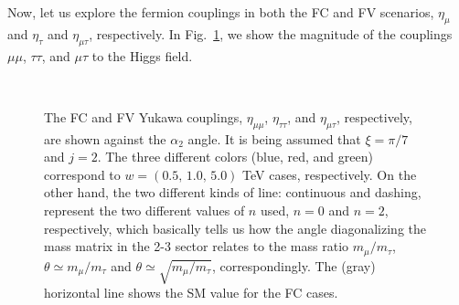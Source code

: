 \documentclass[aps,prd,groupaddress,floatfix,tighten,nofootinbib,showpacs,
amsfonts,superscriptaddress]{revtex4}
\begin{document}
{Now, let us explore the fermion couplings in both the FC and FV scenarios, $\eta_{\mu}$ and $\eta_\tau$ and $\eta_{\mu \tau}$, respectively. In Fig.~\ref{Fig:MuTauMu}, we show
the magnitude of the couplings $\mu\mu$, $\tau\tau$, and $\mu\tau$ to the Higgs field. 
%
\begin{figure}[!htbp]
   \\
  \caption{
The FC and FV Yukawa couplings, $\eta_{\mu \mu}$, $\eta_{\tau \tau}$, and $\eta_{\mu \tau}$, respectively, are shown against the $\alpha_2$ angle. It is being assumed that $\xi = \pi/7$ and $j=2$. The three different colors (blue, red, and green) correspond to $w = (0.5,\, 1.0, \, 5.0)$ TeV cases, respectively. On the other hand, the two different kinds of line: continuous and dashing, represent the two different values of $n$ used, $n=0$ and $n=2$, respectively, which basically tells us how the angle diagonalizing the mass matrix in the 2-3 sector relates to the mass ratio $m_\mu / m_\tau$, $\theta \simeq m_\mu / m_\tau$ and $\theta \simeq \sqrt{m_\mu / m_\tau}$, correspondingly. The (gray) horizontal line shows the SM value for the FC cases. }
   \label{Fig:MuTauMu}
\end{figure}
%
}
\end{document}
